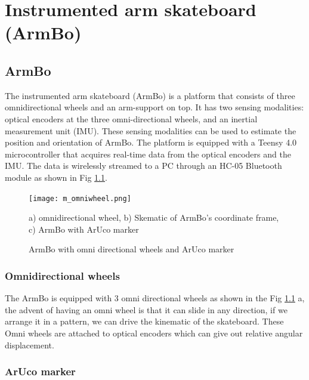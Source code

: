 \documentclass[12pt, twoside]{report}
\begin{document}


\chapter{Instrumented arm skateboard (ArmBo)}

\section{ArmBo}

The instrumented arm skateboard (ArmBo) is a platform that consists of three
omnidirectional wheels and an arm-support on top.
It has two sensing modalities: optical encoders at the three omni-directional wheels,
and an inertial measurement unit (IMU).
These sensing modalities can be used to estimate the position and orientation of ArmBo.
The platform is equipped with a Teensy 4.0 microcontroller that acquires
real-time data from the optical encoders and the IMU.
The data is wirelessly streamed to a PC through an HC-05 Bluetooth module as shown in Fig \ref{fig:omniwheel}.
\begin{figure}[hbt!]
    \centering
    \texttt{[image: m\_omniwheel.png]}
    \caption{ArmBo with omni directional wheels and ArUco marker}
    {a) omnidirectional wheel, b) Skematic of ArmBo's coordinate frame, c)
        ArmBo with ArUco marker}
    \label{fig:omniwheel}
\end{figure}


\subsection{Omnidirectional wheels}

The ArmBo is equipped with 3 omni directional wheels as shown in the Fig \ref{fig:omniwheel} a,
the advent of having an omni wheel is that it can slide in any direction,
if we arrange it in a pattern, we can drive the kinematic of the skateboard.
These Omni wheels are attached to optical encoders which can give out relative
angular displacement.

\subsection{ArUco marker}
\end{document}
